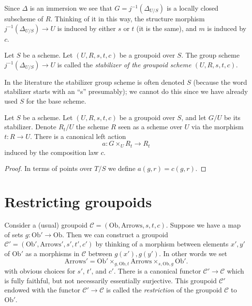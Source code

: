 \noindent
Since $\Delta$ is an immersion we see that $G = j^{-1}(\Delta_{U/S})$
is a locally closed subscheme of $R$. Thinking of it in this way,
the structure morphism $j^{-1}(\Delta_{U/S}) \to U$ is induced by
either $s$ or $t$ (it is the same), and $m$ is induced by $c$.

\begin{definition}
\label{definition-stabilizer-groupoid}
Let $S$ be a scheme.
Let $(U, R, s, t, c)$ be a groupoid over $S$.
The group scheme $j^{-1}(\Delta_{U/S})\to U$
is called the {\it stabilizer of the groupoid scheme
$(U, R, s, t, c)$}.
\end{definition}

\noindent
In the literature the stabilizer group scheme is often denoted $S$
(because the word stabilizer starts with an ``s'' presumably);
we cannot do this since we have already used $S$ for the base scheme.

\begin{lemma}
\label{lemma-groupoid-action-stabilizer}
Let $S$ be a scheme.
Let $(U, R, s, t, c)$ be a groupoid over $S$, and let $G/U$ be its stabilizer.
Denote $R_t/U$ the scheme $R$ seen as a scheme over $U$ via the
morphism $t : R \to U$.
There is a canonical left action
$$
a : G \times_U R_t \longrightarrow R_t
$$
induced by the composition law $c$.
\end{lemma}

\begin{proof}
In terms of points over $T/S$ we define $a(g, r) = c(g, r)$.
\end{proof}








\section{Restricting groupoids}
\label{section-restrict-groupoid}

\noindent
Consider a (usual) groupoid
$\mathcal{C} = (\text{Ob}, \text{Arrows}, s, t, c)$.
Suppose we have a map of sets $g : \text{Ob}' \to \text{Ob}$.
Then we can construct a groupoid
$\mathcal{C}' = (\text{Ob}', \text{Arrows}', s', t', c')$
by thinking of a morphism between elements $x', y'$ of $\text{Ob}'$
as a morphisms in $\mathcal{C}$ between $g(x'), g(y')$.
In other words we set
$$
\text{Arrows}' =
\text{Ob}'
\times_{g, \text{Ob}, t}
\text{Arrows}
\times_{s, \text{Ob}, g}
\text{Ob}'.
$$
with obvious choices for $s'$, $t'$, and $c'$. There is a canonical
functor $\mathcal{C}' \to \mathcal{C}$ which is fully faithful,
but not necessarily essentially surjective. This groupoid $\mathcal{C}'$
endowed with the functor $\mathcal{C}' \to \mathcal{C}$
is called the {\it restriction} of the groupoid
$\mathcal{C}$ to $\text{Ob}'$.


